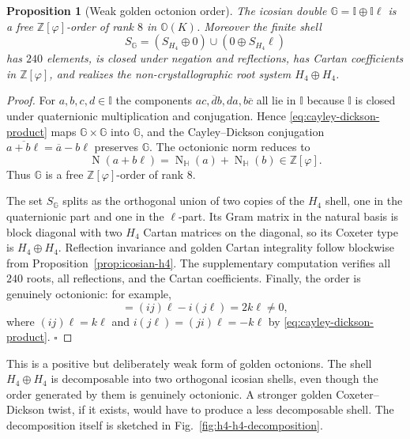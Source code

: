 \documentclass[12pt,oneside,english]{amsart}
\numberwithin{equation}{section}
\numberwithin{figure}{section}
\numberwithin{table}{section}
\theoremstyle{plain}
\newtheorem{proposition}[theorem]{Proposition}
\theoremstyle{definition}
\theoremstyle{remark}
\newcommand{\HH}{\mathbb H}
\newcommand{\Oct}{\mathbb O}
\newcommand{\Zphi}{\mathbb Z[\varphi]}
\newcommand{\Norm}{\operatorname{N}}
\begin{document}
\begin{proposition}[Weak golden octonion order]
\label{prop:weak-golden-octonion}
The icosian double \(\mathbb G=\mathbb I\oplus\mathbb I\ell\) is a free \(\Zphi\)-order of rank \(8\) in \(\Oct(K)\). Moreover the finite shell
\begin{equation}
S_{\mathbb G}=(S_{H_4}\oplus0)\cup(0\oplus S_{H_4}\ell)
\label{eq:golden-octonion-shell}
\end{equation}
has \(240\) elements, is closed under negation and reflections, has Cartan coefficients in \(\Zphi\), and realizes the non-crystallographic root system \(H_4\oplus H_4\).
\end{proposition}

\begin{proof}
For \(a,b,c,d\in\mathbb I\) the components \(ac,\overline{d}b,da,b\overline{c}\) all lie in \(\mathbb I\) because \(\mathbb I\) is closed under quaternionic multiplication and conjugation. Hence \eqref{eq:cayley-dickson-product} maps \(\mathbb G\times\mathbb G\) into \(\mathbb G\), and the Cayley--Dickson conjugation \(\overline{a+b\ell}=\overline{a}-b\ell\) preserves \(\mathbb G\). The octonionic norm reduces to
\begin{equation}
\Norm(a+b\ell)=\Norm_{\HH}(a)+\Norm_{\HH}(b)\in\Zphi.
\label{eq:double-norm}
\end{equation}
Thus \(\mathbb G\) is a free \(\Zphi\)-order of rank \(8\).

The set \(S_{\mathbb G}\) splits as the orthogonal union of two copies of the \(H_4\) shell, one in the quaternionic part and one in the \(\ell\)-part. Its Gram matrix in the natural basis is block diagonal with two \(H_4\) Cartan matrices on the diagonal, so its Coxeter type is \(H_4\oplus H_4\). Reflection invariance and golden Cartan integrality follow blockwise from Proposition~\ref{prop:icosian-h4}. The supplementary computation verifies all \(240\) roots, all reflections, and the Cartan coefficients. Finally, the order is genuinely octonionic: for example,
\begin{equation}
[i,j,\ell]=(ij)\ell-i(j\ell)=2k\ell\neq0,
\label{eq:nonzero-associator}
\end{equation}
where \((ij)\ell=k\ell\) and \(i(j\ell)=(ji)\ell=-k\ell\) by \eqref{eq:cayley-dickson-product}. \(\square\)
\end{proof}

This is a positive but deliberately weak form of golden octonions. The shell \(H_4\oplus H_4\) is decomposable into two orthogonal icosian shells, even though the order generated by them is genuinely octonionic. A stronger golden Coxeter--Dickson twist, if it exists, would have to produce a less decomposable shell. The decomposition itself is sketched in Fig.~\ref{fig:h4-h4-decomposition}.
\end{document}
